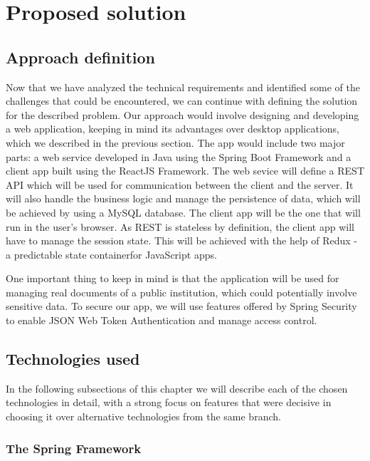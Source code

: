 \chapter{Proposed solution}
\label{chapter:proposedSolution}

\section{Approach definition}
\label{section:approachDefinition}

Now that we have analyzed the technical requirements and identified some of the challenges that could be encountered, we can continue with defining the solution for the described problem. Our approach would involve designing and developing a web application, keeping in mind its advantages over desktop applications, which we described in the previous section. The app would include two major parts: a web service developed in Java using the Spring Boot Framework and a client app built using the ReactJS Framework. The web sevice will define a REST API which will be used for communication between the client and the server. It will also handle the business logic and manage the persistence of data, which will be achieved by using a MySQL database. The client app will be the one that will run in the user's browser. As REST is stateless by definition, the client app will have to manage the session state. This will be achieved with the help of Redux - a predictable state containerfor JavaScript apps.

One important thing to keep in mind is that the application will be used for managing real documents of a public institution, which could potentially involve sensitive data. To secure our app, we will use features offered by Spring Security to enable JSON Web Token Authentication and manage access control.


\section{Technologies used}
\label{section:technologiesUsed}

In the following subsections of this chapter we will describe each of the chosen technologies in detail, with a strong focus on features that were decisive in choosing it over alternative technologies from the same branch.


\subsection{The Spring Framework}
\label{subsection:theSpringFramework}


